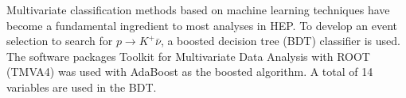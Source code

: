 Multivariate classification methods based on machine learning techniques have become a fundamental ingredient to most analyses in HEP. 
To develop an event selection to search for $p\rightarrow K^{+} \bar{\nu}$, a boosted decision tree (BDT) classifier is used. The software packages Toolkit for Multivariate Data Analysis with ROOT (TMVA4)
was used with AdaBoost as the boosted algorithm. A total of 14 variables are used in the BDT.  
